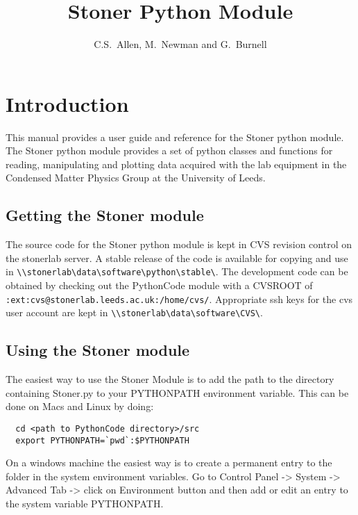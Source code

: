 \documentclass[a4paper,11pt]{scrartcl}
\author{C.S.~Allen, M.~Newman and G.~Burnell}
\title{Stoner Python Module}
\begin{document}
\maketitle

\tableofcontents
\newpage
\pagestyle{scrheadings}  \ifoot[\today]{\today}



  \section{Introduction}

This manual provides a user guide and reference for the Stoner python module. The Stoner python module provides a set of python classes and functions for reading, manipulating and plotting data acquired with the lab equipment in the Condensed Matter Physics Group at the University of Leeds.

\subsection{Getting the Stoner module}

The source code for the Stoner python module is kept in CVS revision control on the stonerlab server. A stable release of the code is available for copying and use in \verb#\\stonerlab\data\software\python\stable\#. The development code can be obtained by checking out the PythonCode module with a CVSROOT of \\ \verb#:ext:cvs@stonerlab.leeds.ac.uk:/home/cvs/#. Appropriate ssh keys for the cvs user account are kept in \verb#\\stonerlab\data\software\CVS\#.

\subsection{Using the Stoner module}

The easiest way to use the Stoner Module is to add the path to the directory containing Stoner.py to your PYTHONPATH environment variable. This can be done on Macs and Linux by doing:
\begin{verbatim}
  cd <path to PythonCode directory>/src
  export PYTHONPATH=`pwd`:$PYTHONPATH
\end{verbatim}
On a windows machine the easiest way is to create a permanent entry to the folder in the system environment variables. Go to Control Panel -> System -> Advanced Tab -> click on Environment button and then add or edit an entry to the system variable PYTHONPATH.
\end{document}
